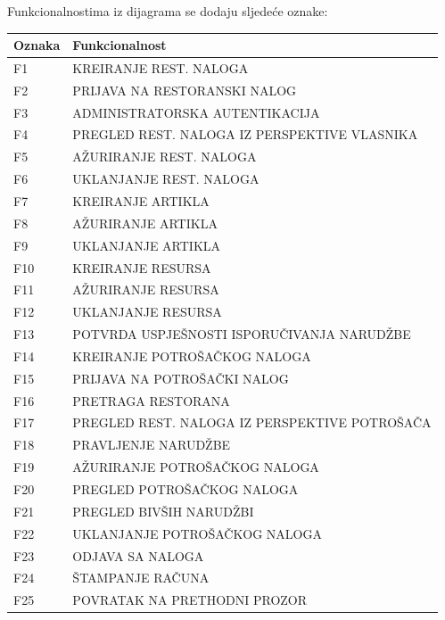 \documentclass{scrreprt}
\begin{document}
Funkcionalnostima iz dijagrama se dodaju sljedeće oznake:

\begin{center}
	\begin{tabular}{|l|l|}
		\hline
		\textbf{Oznaka} & \textbf{Funkcionalnost} \\ \hline
		\hline
		F1  & KREIRANJE REST. NALOGA \\ \hline
		F2  & PRIJAVA NA RESTORANSKI NALOG \\ \hline
		F3  & ADMINISTRATORSKA AUTENTIKACIJA \\ \hline
		F4  & PREGLED REST. NALOGA IZ PERSPEKTIVE VLASNIKA \\ \hline
		F5  & AŽURIRANJE REST. NALOGA \\ \hline
		F6  & UKLANJANJE REST. NALOGA \\ \hline
		F7  & KREIRANJE ARTIKLA \\ \hline
		F8  & AŽURIRANJE ARTIKLA \\ \hline
		F9  & UKLANJANJE ARTIKLA \\ \hline
		F10 & KREIRANJE RESURSA \\ \hline
		F11 & AŽURIRANJE RESURSA \\ \hline
		F12 & UKLANJANJE RESURSA \\ \hline
		F13 & POTVRDA USPJEŠNOSTI ISPORUČIVANJA NARUDŽBE \\ \hline
		F14 & KREIRANJE POTROŠAČKOG NALOGA \\ \hline
		F15 & PRIJAVA NA POTROŠAČKI NALOG \\ \hline
		F16 & PRETRAGA RESTORANA \\ \hline
		F17 & PREGLED REST. NALOGA IZ PERSPEKTIVE POTROŠAČA \\ \hline
		F18 & PRAVLJENJE NARUDŽBE \\ \hline
		F19 & AŽURIRANJE POTROŠAČKOG NALOGA \\ \hline
		F20 & PREGLED POTROŠAČKOG NALOGA \\ \hline
		F21 & PREGLED BIVŠIH NARUDŽBI \\ \hline
		F22 & UKLANJANJE POTROŠAČKOG NALOGA \\ \hline
		F23 & ODJAVA SA NALOGA \\ \hline
		F24 & ŠTAMPANJE RAČUNA \\ \hline
		F25 & POVRATAK NA PRETHODNI PROZOR \\ \hline %

	\end{tabular}
\end{center}
\end{document}
